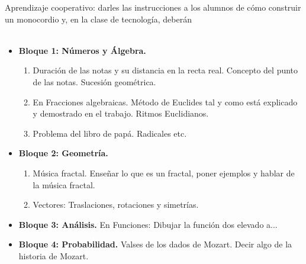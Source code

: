 \documentclass[a4paper, openright, 11pt, titlepage]{report}
\theoremstyle{definition}\newtheorem{defin}[propo]{Definition}
\theoremstyle{definition}\newtheorem{obser}[propo]{Remark}
\theoremstyle{definition}\newtheorem{ejem}[propo]{Ejemplo}
\theoremstyle{definition}\newtheorem{algoritmo}[propo]{Algoritmo}
\begin{document}

Aprendizaje cooperativo: darles las instrucciones a los alumnos de cómo construir un monocordio y, en la clase de tecnología, deberán \\\\
\begin{itemize}
    \item \textbf{Bloque 1: Números y Álgebra.}
    \begin{enumerate}
        \item Duración de las notas y su distancia en la recta real. Concepto del punto de las notas. Sucesión geométrica.
        \item En Fracciones algebraicas. Método de Euclides tal y como está explicado y demostrado en el trabajo. Ritmos Euclidianos.
        \item Problema del libro de papá. Radicales etc.
    \end{enumerate}
    \item \textbf{Bloque 2: Geometría.}
    \begin{enumerate}
        \item Música fractal. Enseñar lo que es un fractal, poner ejemplos y hablar de la música fractal.
        \item Vectores: Traslaciones, rotaciones y simetrías.
    \end{enumerate}
    \item \textbf{Bloque 3: Análisis.} En Funciones: Dibujar la función dos elevado a... 
    \item \textbf{Bloque 4: Probabilidad.} Valses de los dados de Mozart. Decir algo de la historia de Mozart.
\end{itemize}
\end{document}
